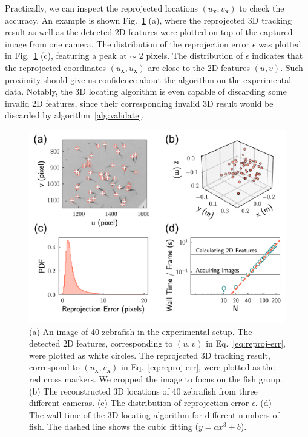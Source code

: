 \documentclass[11pt,twoside]{report}
\begin{document}
Practically, we can inspect the reprojected locations $(u_\mathbf{x}, v_\mathbf{x})$ to check the accuracy.
An example is shown Fig.~\ref{fig:locate-performance} (a), where the reprojected 3D tracking result as well as the detected 2D features were plotted on top of the captured image from one camera.
The distribution of the reprojection error $\epsilon$ was plotted in Fig.~\ref{fig:locate-performance} (c), featuring a peak at $\sim$ 2 pixels.
The distribution of $\epsilon$ indicates that the reprojected coordinates $(u_\mathbf{x}, u_\mathbf{x})$ are close to the 2D features $(u, v)$.
Such proximity should give us confidence about the algorithm on the experimental data. Notably, the 3D locating algorithm is even capable of discarding some invalid 2D features, since their corresponding invalid 3D result would be discarded by algorithm~\ref{alg:validate}.


\begin{figure}
  \includegraphics[width=\linewidth]{locate-perform}
  \caption[Performance of the 3D locating method]{
  (a) An image of 40 zebrafish in the experimental setup.  The detected 2D features, corresponding to $(u, v)$ in Eq.~\ref{eq:reproj-err}, were plotted as white circles. The reprojected 3D tracking result, correspond to $(u_\mathbf{x}, v_\mathbf{x})$ in Eq.~\ref{eq:reproj-err}, were plotted as the red cross markers. We cropped the image to focus on the fish group. 
  (b) The reconstructed 3D locations of 40 zebrafish from three different cameras.
  (c) The distribution of reprojection error $\epsilon$.
  (d) The wall time of the 3D locating algorithm for different numbers of fish. The dashed line shows the cubic fitting ($y = a x^3 + b$).
  }
\label{fig:locate-performance}
\end{figure}
\end{document}
